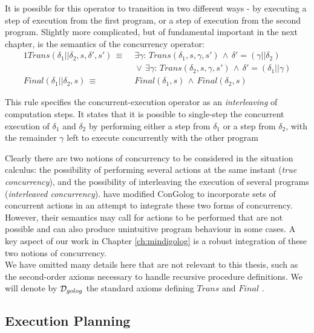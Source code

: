 It is possible for this operator to transition in two different ways
- by executing a step of execution from the first program, or a step
of execution from the second program. Slightly more complicated, but
of fundamental important in the next chapter, is the semantics of
the concurrency operator:\begin{alignat*}{1}
Trans(\delta_{1}||\delta_{2},s,\delta',s')\,\equiv\, & \,\exists\gamma:\, Trans(\delta_{1},s,\gamma,s')\,\wedge\,\delta'=(\gamma||\delta_{2})\\
 & \,\vee\,\exists\gamma:\, Trans(\delta_{2},s,\gamma,s')\,\wedge\,\delta'=(\delta_{1}||\gamma)\\
Final(\delta_{1}||\delta_{2},s)\,\equiv\, & \, Final(\delta_{1},s)\,\wedge\, Final(\delta_{2},s)\end{alignat*}


This rule specifies the concurrent-execution operator as an \emph{interleaving}
of computation steps. It states that it is possible to single-step
the concurrent execution of $\delta_{1}$ and $\delta_{2}$ by performing
either a step from $\delta_{1}$ or a step from $\delta_{2}$, with
the remainder $\gamma$ left to execute concurrently with the other
program

Clearly there are two notions of concurrency to be considered in the
situation calculus: the possibility of performing several actions
at the same instant (\emph{true concurrency}), and the possibility
of interleaving the execution of several programs (\emph{interleaved
concurrency}). \citet{pinto99tcongolog} have modified ConGolog to
incorporate sets of concurrent actions in an attempt to integrate
these two forms of concurrency. However, their semantics may call
for actions to be performed that are not possible and can also produce
unintuitive program behaviour in some cases. A key aspect of our work
in Chapter \ref{ch:mindigolog} is a robust integration of these two
notions of concurrency.\\


We have omitted many details here that are not relevant to this thesis,
such as the second-order axioms necessary to handle recursive procedure
definitions. We will denote by $\mathcal{D}_{golog}$ the standard axioms
defining $Trans$ and $Final$ \citep{giacomo00congolog,giacomo99indigolog}.


\subsection{Execution Planning\label{sec:Background:Golog-Exec-Planning}}


